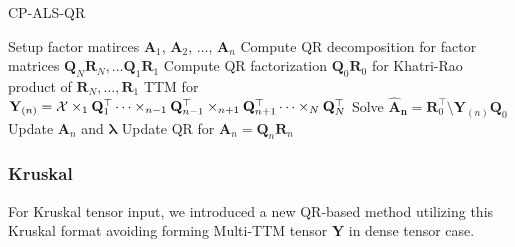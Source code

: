 \documentclass{article}
\newcommand{\mat}[1]{\mathbf{#1}}
\newcommand{\M}[2][]{\bm{#1{\mathbf{\MakeUppercase{#2}}}}} 		%
\newcommand{\T}[2][]{#1{\mathbf{\cal{#2}}}} 						%
\begin{document}
\begin{algorithm}
  \caption{CP-ALS-QR}
  \label{alg:cp-als-qr}
  \begin{algorithmic}[1]
    \Function{$[\bm{\lambda},\M{A}_{n}]=$ CP-ALS}{$\T{X},R$}
      \State Setup factor matirces  $\mat{A}_1$, $\mat{A}_2$, $\dots$, $\mat{A}_n$
      \State Compute QR decomposition for factor matrices $\mat{Q}_N\mat{R}_N, \dots \mat{Q}_1\mat{R}_1$
      \State Compute QR factorization $\mat{Q}_0\mat{R}_0$ for Khatri-Rao product of $\mat{R}_N, \dots, \mat{R}_1$
      \State TTM for $\mat{Y}_{(n)} =  \T{X} \times_1 \mat{Q}_1^\top \dots \times_{n-1} \mat{Q}_{n-1}^\top \times_{n+1} \mat{Q}_{n+1}^\top \dots \times_N \mat{Q}_N^\top$
      \State Solve $\mat{\hat{A}_n} = \mat{R}_0^\top \text{\textbackslash} \mat{Y}_{(n)} \mat{Q}_0$
      \State Update $\mat{A}_n$ and $\bm{\lambda}$
      \State Update QR for $\mat{A}_n = \mat{Q}_n\mat{R}_n$      
      \EndFor
      \EndWhile
    \EndFunction
  \end{algorithmic}
\end{algorithm}



\subsubsection*{Kruskal}
For Kruskal tensor input, we introduced a new QR-based method utilizing this Kruskal format avoiding
forming Multi-TTM tensor $\mat{Y}$ in dense tensor case.
\end{document}
